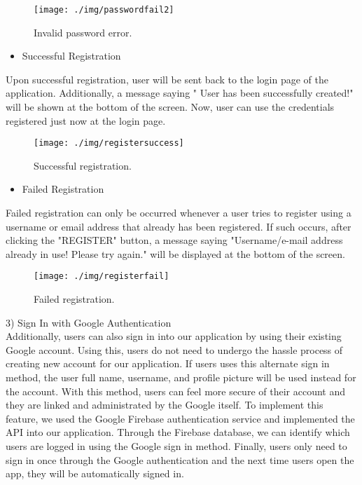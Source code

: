 \documentclass[conference]{IEEEtran}
\begin{document}
\begin{figure}[h!]
\texttt{[image: ./img/passwordfail2]}
\centering
\caption{Invalid password error.}
\end{figure}

\begin{itemize}
\item Successful Registration
\end{itemize}
Upon successful registration, user will be sent back to the login page of the application. Additionally, a message saying " User has been successfully created!" will be shown at the bottom of the screen. Now, user can use the credentials registered just now at the login page.

\begin{figure}[h!]
\texttt{[image: ./img/registersuccess]}
\centering
\caption{Successful registration.}
\end{figure}
\begin{itemize}
\item Failed Registration
\end{itemize}
Failed registration can only be occurred whenever a user tries to register using a username or email address that already has been registered. If such occurs, after clicking the "REGISTER" button, a message saying "Username/e-mail address already in use! Please try again." will be displayed at the bottom of the screen.

\begin{figure}[h!]
\texttt{[image: ./img/registerfail]}
\centering
\caption{Failed registration.}
\end{figure}

3) Sign In with Google Authentication\\

Additionally, users can also sign in into our application by using their existing Google account. Using this, users do not need to undergo the hassle process of creating new account for our application. If users uses this alternate sign in method, the user full name, username, and profile picture will be used instead for the account. With this method, users can feel more secure of their account and they are linked and administrated by the Google itself. To implement this feature, we used the Google Firebase authentication service and implemented the API into our application. Through the Firebase database, we can identify which users are logged in using the Google sign in method. Finally, users only need to sign in once through the Google authentication and the next time users open the app, they will be automatically signed in.
\end{document}
